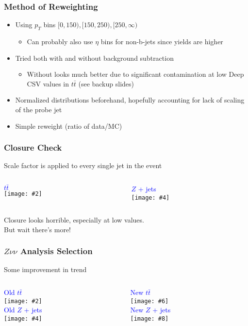 \documentclass{beamer}
\newcommand{\twofigs}[4]{
  \begin{columns}
    \begin{column}{0.5\linewidth}
      \centering
      \textcolor{blue}{#1} \\
      \texttt{[image: \#2]}
    \end{column}
    \begin{column}{0.5\linewidth}
      \centering
      \textcolor{blue}{#3} \\
      \texttt{[image: \#4]}
    \end{column}
  \end{columns}
}
\newcommand{\fourfigs}[8]{
  \begin{columns}
    \begin{column}{0.3\linewidth}
      \centering
      \textcolor{blue}{#1} \\
      \texttt{[image: \#2]} \\
      \textcolor{blue}{#3} \\
      \texttt{[image: \#4]}
    \end{column}
    \begin{column}{0.3\linewidth}
      \centering
      \textcolor{blue}{#5} \\
      \texttt{[image: \#6]} \\
      \textcolor{blue}{#7} \\
      \texttt{[image: \#8]}
    \end{column}
  \end{columns}
}
\newcommand{\ttbar}{\ensuremath{t\bar{t}}}
\begin{document}
\begin{frame}
  \frametitle{Method of Reweighting}

  \begin{itemize}
  \item Using $p_T$ bins $[0, 150), [150, 250), [250, \infty)$
    \begin{itemize}
    \item Can probably also use $\eta$ bins for non-b-jets since yields are higher
    \end{itemize}
  \item Tried both with and without background subtraction
    \begin{itemize}
    \item Without looks much better due to significant contamination
      at low Deep CSV values in $\ttbar$ (see backup slides)
    \end{itemize}
  \item Normalized distributions beforehand,
    hopefully accounting for lack of scaling of the probe jet
  \item Simple reweight (ratio of data/MC)
  \end{itemize}

\end{frame}

\begin{frame}
  \frametitle{Closure Check}

  Scale factor is applied to every single jet in the event

  \twofigs{\ttbar}
          {190215_closure/tt_jet2_deepCSVb.pdf}
          {$Z$ + jets}
          {190215_closure/z_jet2_deepCSVb.pdf}

  Closure looks horrible, especially at low values. \\ But wait there's more!

\end{frame}

\begin{frame}
  \frametitle{$Z\nu\nu$ Analysis Selection}

  Some improvement in trend

  \fourfigs{Old \ttbar}
           {190219_olddeep/tt_jet2_deepCSVb.pdf}
           {Old $Z$ + jets}
           {190219_olddeep/heavyz_jet2_deepCSVb.pdf}
           {New \ttbar}
           {190219_newdeep/tt_jet2_deepCSVb.pdf}
           {New $Z$ + jets}
           {190219_newdeep/heavyz_jet2_deepCSVb.pdf}

\end{frame}
\end{document}
